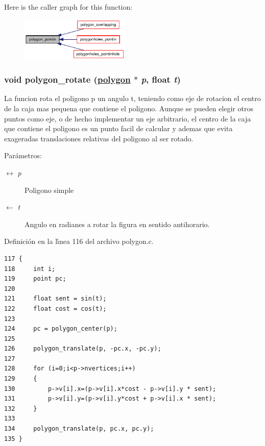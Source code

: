 Here is the caller graph for this function:\begin{figure}[H]
\begin{center}
\leavevmode
\includegraphics[width=148pt]{group__geometry_geab0a1d6da7c44ae49494958bb885504_geab0a1d6da7c44ae49494958bb885504_icgraph}
\end{center}
\end{figure}
\hypertarget{group__geometry_g95276abee7240f116afaf80a3e1f23c4_g95276abee7240f116afaf80a3e1f23c4}{
\subsubsection[polygon\_\-rotate]{\setlength{\rightskip}{0pt plus 5cm}void polygon\_\-rotate (\hyperlink{struct__polygon}{polygon} $\ast$ {\em p}, float {\em t})}}
\label{group__geometry_g95276abee7240f116afaf80a3e1f23c4_g95276abee7240f116afaf80a3e1f23c4}


La funcion rota el poligono p un angulo t, teniendo como eje de rotacion el centro de la caja mas pequena que contiene el poligono. Aunque se pueden elegir otros puntos como eje, o de hecho implementar un eje arbitrario, el centro de la caja que contiene el poligono es un punto facil de calcular y ademas que evita exageradas translaciones relativas del poligono al ser rotado.

\begin{Desc}
\item[Par\'{a}metros:]
\begin{description}
\item[\mbox{$\leftrightarrow$} {\em p}]Poligono simple \item[\mbox{$\leftarrow$} {\em t}]Angulo en radianes a rotar la figura en sentido antihorario. \end{description}
\end{Desc}


Definici\'{o}n en la l\'{\i}nea 116 del archivo polygon.c.

\begin{Code}\begin{verbatim}117 {
118     int i;
119     point pc;
120 
121     float sent = sin(t);
122     float cost = cos(t);
123 
124     pc = polygon_center(p);
125 
126     polygon_translate(p, -pc.x, -pc.y);
127 
128     for (i=0;i<p->nvertices;i++)
129     {
130         p->v[i].x=(p->v[i].x*cost - p->v[i].y * sent);
131         p->v[i].y=(p->v[i].y*cost + p->v[i].x * sent);
132     }
133 
134     polygon_translate(p, pc.x, pc.y);
135 }
\end{verbatim}\end{Code}




